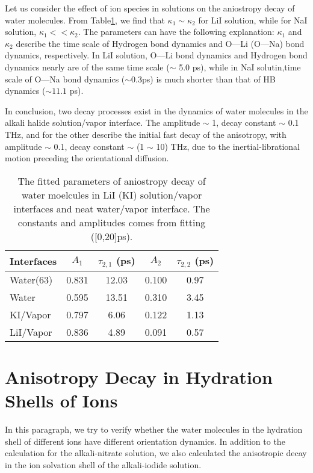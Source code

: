 Let us consider the effect of ion species in solutions on the aniostropy decay of water molecules.
From Table\thinspace\ref{biexponential}, we find that $\kappa_1\sim\kappa_2$ for LiI solution, 
while for NaI solution, $\kappa_1<<\kappa_2$.
The parameters can have the following explanation: $\kappa_1$ and $\kappa_2$ describe the time scale of Hydrogen bond dynamics and O---Li (O---Na) bond dynamics, respectively. 
In LiI solution, O---Li bond dynamics and Hydrogen bond dynamics nearly are of the same time scale ($\sim$ 5.0 ps), 
while in NaI solutin,time scale of O---Na bond dynamics ($\sim 0.3$ps) is much shorter than that of HB dynamics ($\sim 11.1$ ps). 

In conclusion, two decay processes exist in the dynamics of water molecules in the alkali halide solution/vapor interface.
The amplitude $\sim$ 1, decay constant $\sim$ 0.1 THz, and for the other describe the initial fast decay of the anisotropy, 
with amplitude $\sim$ 0.1, decay constant $\sim$ (1 $\sim$ 10) THz, due to the inertial-librational motion preceding the orientational diffusion.

\begin{table} [H] %
\centering
\caption{\label{tab:table_2KI_2LiI_anisotropy_decay}%
The fitted parameters of aniostropy decay of water moelcules in LiI (KI) solution/vapor interfaces and neat water/vapor interface. 
The constants and amplitudes comes from fitting ([0,20]ps).}
\begin{tabular}{lcccc}
Interfaces & $A_1$  & $\tau_{2,1}$ (ps) & $A_2$ & $\tau_{2,2}$ (ps) \\
\hline
Water(63) & 0.831 & 12.03 & 0.100 & 0.97 \\
Water & 0.595 & 13.51 & 0.310  & 3.45 \\
KI/Vapor & 0.797 & 6.06 & 0.122 & 1.13 \\
LiI/Vapor & 0.836 & 4.89 & 0.091 & 0.57 \\ 
\end{tabular}
\label{biexponential}
\end{table}

\FloatBarrier
\section{Anisotropy Decay in Hydration Shells of Ions}
In this paragraph, we try to verify whether the water molecules in the hydration shell of different ions have different orientation dynamics. 
In addition to the calculation for the alkali-nitrate solution, we also calculated the anisotropic decay in the ion solvation shell of the alkali-iodide solution.
